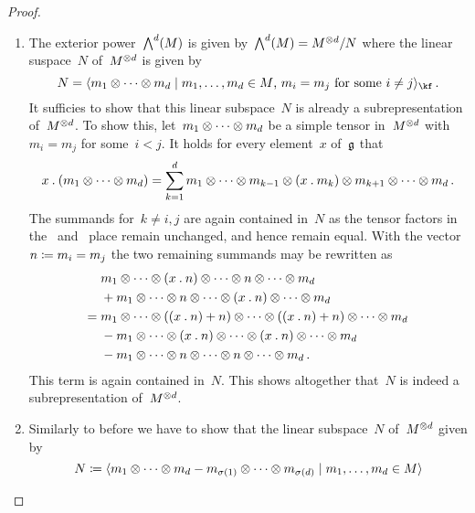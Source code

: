 \begin{proof}
	\leavevmode
	\begin{enumerate}
		\item
			The exterior power~$\operatorname{\bigwedge}^d(M)$ is given by~$\operatorname{\bigwedge}^d(M) = M^{\otimes d} / N$ where the linear suspace~$N$ of~$M^{\otimes d}$ is given by
			\[
				N
				=
				\gen{
					m_1 \tensor \dotsb \tensor m_d
				\suchthat
					\text{$m_1, \dotsc, m_d \in M$,~$m_i = m_j$ for some~$i \neq j$}
				}_{\kf} \,.
			\]
			It sufficies to show that this linear subspace~$N$ is already a subrepresentation of~$M^{\otimes d}$.
			To show this, let~$m_1 \otimes \dotsb \otimes m_d$ be a simple tensor in~$M^{\otimes d}$ with~$m_i = m_j$ for some~$i < j$.
			It holds for every element~$x$ of~$\mathfrak{g}$ that
			\[
				x \mathbin{.} (m_1 \otimes \dotsb \otimes m_d)
				=
				\sum_{k=1}^d m_1
				\otimes \dotsb \otimes m_{k-1}
				\otimes (x \mathbin{.} m_k)
				\otimes m_{k+1} \otimes \dotsb \otimes m_d  \,.
			\]
			The summands for~$k \neq i,j$ are again contained in~$N$ as the tensor factors in the~{} and~{} place remain unchanged, and hence remain equal.
			With the vector~$n \coloneqq m_i = m_j$ the two remaining summands may be rewritten as
			\begin{align*}
				{}&
					m_1 \otimes \dotsb
					\otimes (x \mathbin{.} n)
					\otimes \dotsb
					\otimes n
					\otimes \dotsb \otimes m_d
				\\
				{}&
				+ m_1 \otimes \dotsb
					\otimes n
					\otimes \dotsb
					\otimes (x \mathbin{.} n)
					\otimes \dotsb \otimes m_d
				\\
				={}&
					m_1 \otimes \dotsb
					\otimes ( (x \mathbin{.} n) + n )
					\otimes \dotsb
					\otimes ( (x \mathbin{.} n) + n )
					\otimes \dotsb \otimes m_d
				\\
				{}&
				- m_1 \otimes \dotsb
					\otimes (x \mathbin{.} n)
					\otimes \dotsb
					\otimes (x \mathbin{.} n)
					\otimes \dotsb \otimes m_d
				\\
				{}&
				- m_1 \otimes \dotsb
					\otimes n
					\otimes \dotsb
					\otimes n
					\otimes \dotsb \otimes m_d  \,.
			\end{align*}
			This term is again contained in~$N$.
			This shows altogether that~$N$ is indeed a subrepresentation of~$M^{\otimes d}$.
		\item
			Similarly to before we have to show that the linear subspace~$N$ of~$M^{\otimes d}$ given by
			\[
				N
				\defined
				\gen{
					m_1 \tensor \dotsb \tensor m_d
					- m_{\sigma(1)} \tensor \dotsb \tensor m_{\sigma(d)}
				\suchthat
					m_1, \dotsc, m_d \in M
}\]
\end{enumerate}
\end{proof}
